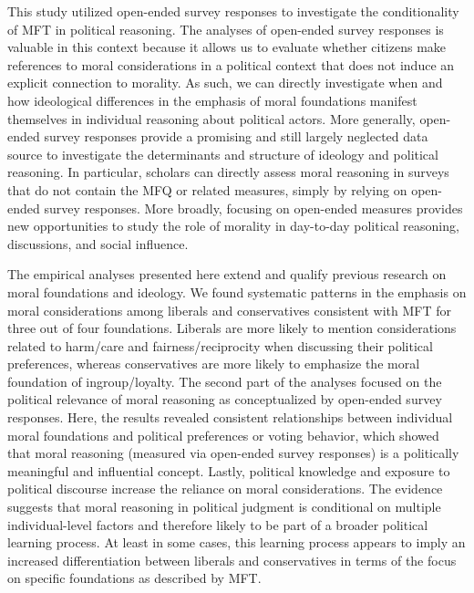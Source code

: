 \documentclass[12pt]{article}
\begin{document}
This study utilized open-ended survey responses to investigate the conditionality of MFT in political reasoning. The analyses of open-ended survey responses is valuable in this context because it allows us to evaluate whether citizens make references to moral considerations in a political context that does not induce an explicit connection to morality. As such, we can directly investigate when and how ideological differences in the emphasis of moral foundations manifest themselves in individual reasoning about political actors. More generally, open-ended survey responses provide a promising and still largely neglected data source to investigate the determinants and structure of ideology and political reasoning. In particular, scholars can directly assess moral reasoning in surveys that do not contain the MFQ or related measures, simply by relying on open-ended survey responses. More broadly, focusing on open-ended measures provides new opportunities to study the role of morality in day-to-day political reasoning, discussions, and social influence.

The empirical analyses presented here extend and qualify previous research on moral foundations and ideology. We found systematic patterns in the emphasis on moral considerations among liberals and conservatives consistent with MFT for three out of four foundations. Liberals are more likely to mention considerations related to harm/care and fairness/reciprocity when discussing their political preferences, whereas conservatives are more likely to emphasize the moral foundation of ingroup/loyalty. The second part of the analyses focused on the political relevance of moral reasoning as conceptualized by open-ended survey responses. Here, the results revealed consistent relationships between individual moral foundations and political preferences or voting behavior, which showed that moral reasoning (measured via open-ended survey responses) is a politically meaningful and influential concept. Lastly, political knowledge and exposure to political discourse increase the reliance on moral considerations. The evidence suggests that moral reasoning in political judgment is conditional on multiple individual-level factors and therefore likely to be part of a broader political learning process. At least in some cases, this learning process appears to imply an increased differentiation between liberals and conservatives in terms of the focus on specific foundations as described by MFT.
\end{document}
